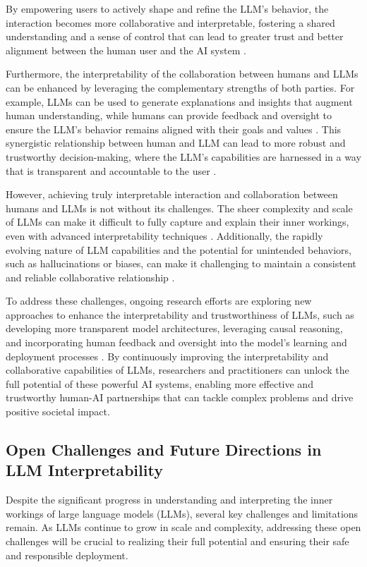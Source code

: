 \documentclass[11pt]{article}
\begin{document}
By empowering users to actively shape and refine the LLM's behavior, the interaction becomes more collaborative and interpretable, fostering a shared understanding and a sense of control that can lead to greater trust and better alignment between the human user and the AI system \cite{ref289,ref290}.

Furthermore, the interpretability of the collaboration between humans and LLMs can be enhanced by leveraging the complementary strengths of both parties. For example, LLMs can be used to generate explanations and insights that augment human understanding, while humans can provide feedback and oversight to ensure the LLM's behavior remains aligned with their goals and values \cite{ref291}. This synergistic relationship between human and LLM can lead to more robust and trustworthy decision-making, where the LLM's capabilities are harnessed in a way that is transparent and accountable to the user \cite{ref292,ref293}.

However, achieving truly interpretable interaction and collaboration between humans and LLMs is not without its challenges. The sheer complexity and scale of LLMs can make it difficult to fully capture and explain their inner workings, even with advanced interpretability techniques \cite{ref237,ref294}. Additionally, the rapidly evolving nature of LLM capabilities and the potential for unintended behaviors, such as hallucinations or biases, can make it challenging to maintain a consistent and reliable collaborative relationship \cite{ref178}.

To address these challenges, ongoing research efforts are exploring new approaches to enhance the interpretability and trustworthiness of LLMs, such as developing more transparent model architectures, leveraging causal reasoning, and incorporating human feedback and oversight into the model's learning and deployment processes \cite{ref295,ref296}. By continuously improving the interpretability and collaborative capabilities of LLMs, researchers and practitioners can unlock the full potential of these powerful AI systems, enabling more effective and trustworthy human-AI partnerships that can tackle complex problems and drive positive societal impact.

\subsection{Open Challenges and Future Directions in LLM Interpretability}

Despite the significant progress in understanding and interpreting the inner workings of large language models (LLMs), several key challenges and limitations remain. As LLMs continue to grow in scale and complexity, addressing these open challenges will be crucial to realizing their full potential and ensuring their safe and responsible deployment.
\end{document}
